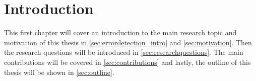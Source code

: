 \chapter{Introduction}
\label{chap:introduction}
This first chapter will cover an introduction to the main research topic and motivation of this thesis in \autoref{sec:errordetection_intro} and \autoref{sec:motivation}. Then the research questions will be introduced in \autoref{sec:researchquestions}. The main contributions will be covered in \autoref{sec:contributions} and lastly, the outline of this thesis will be shown in \autoref{sec:outline}.



